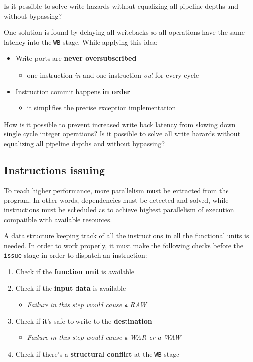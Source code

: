 \documentclass[english]{article}
\begin{document}
Is it possible to solve write hazards without equalizing all pipeline depths and without bypassing?

One solution is found by delaying all writebacks so all operations have the same latency into the \texttt{WB} stage.
While applying this idea:

\begin{itemize}
  \item Write ports are \textbf{never oversubscribed}
        \begin{itemize}
          \item one instruction \textit{in} and one instruction \textit{out} for every cycle
        \end{itemize}
  \item Instruction commit happens \textbf{in order}
        \begin{itemize}
          \item it simplifies the precise exception implementation
        \end{itemize}
\end{itemize}

How is it possible to prevent increased write back latency from slowing down single cycle integer operations?
Is it possible to solve all write hazards without equalizing all pipeline depths and without bypassing?

\subsection{Instructions issuing}
\label{sec:instructions-issuing}

To reach higher performance, more parallelism must be extracted from the program.
In other words, dependencies must be detected and solved, while instructions must be scheduled as to achieve highest parallelism of execution compatible with available resources.

A data structure keeping track of all the instructions in all the functional units is needed.
In order to work properly, it must make the following checks before the \texttt{issue} stage in order to dispatch an instruction:

\begin{enumerate}
  \item Check if the \textbf{function unit} is available
  \item Check if the \textbf{input data} is available
        \begin{itemize}
          \item \textit{Failure in this step would cause a RAW}
        \end{itemize}
  \item Check if it's safe to write to the \textbf{destination}
        \begin{itemize}
          \item \textit{Failure in this step would cause a WAR or a WAW}
        \end{itemize}
  \item Check if there's a \textbf{structural conflict} at the \texttt{WB} stage
\end{enumerate}
\end{document}
